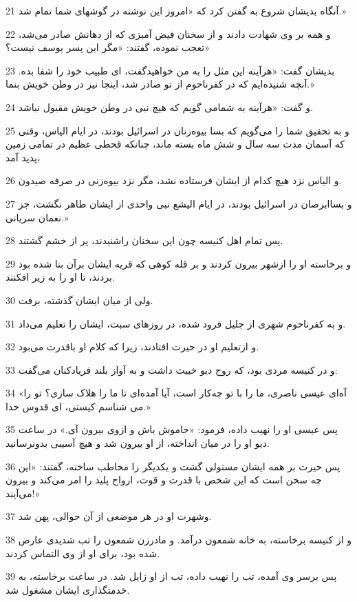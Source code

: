 \par 21 آنگاه بدیشان شروع به گفتن کرد که «امروز این نوشته در گوشهای شما تمام شد.»
\par 22 و همه بر وی شهادت دادند و از سخنان فیض آمیزی که از دهانش صادر می‌شد، تعجب نموده، گفتند: «مگر این پسر یوسف نیست؟»
\par 23 بدیشان گفت: «هرآینه این مثل را به من خواهیدگفت، ای طبیب خود را شفا بده. آنچه شنیده‌ایم که در کفرناحوم از تو صادر شد، اینجا نیز در وطن خویش بنما.»
\par 24 و گفت: «هرآینه به شمامی گویم که هیچ نبی در وطن خویش مقبول نباشد.
\par 25 و به تحقیق شما را می‌گویم که بسا بیوه‌زنان در اسرائیل بودند، در ایام الیاس، وقتی که آسمان مدت سه سال و شش ماه بسته ماند، چنانکه قحطی عظیم در تمامی زمین پدید آمد،
\par 26 و الیاس نزد هیچ کدام از ایشان فرستاده نشد، مگر نزد بیوه‌زنی در صرفه صیدون.
\par 27 و بساابرصان در اسرائیل بودند، در ایام الیشع نبی واحدی از ایشان طاهر نگشت، جز نعمان سریانی.»
\par 28 پس تمام اهل کنیسه چون این سخنان راشنیدند، پر از خشم گشتند.
\par 29 و برخاسته او را ازشهر بیرون کردند و بر قله کوهی که قریه ایشان برآن بنا شده بود بردند، تا او را به زیر افکنند.
\par 30 ولی از میان ایشان گذشته، برفت.
\par 31 و به کفرناحوم شهری از جلیل فرود شده، در روزهای سبت، ایشان را تعلیم می‌داد.
\par 32 و ازتعلیم او در حیرت افتادند، زیرا که کلام او باقدرت می‌بود.
\par 33 و در کنیسه مردی بود، که روح دیو خبیث داشت و به آواز بلند فریادکنان می‌گفت:
\par 34 «آه‌ای عیسی ناصری، ما را با تو چه‌کار است، آیا آمده‌ای تا ما را هلاک سازی؟ تو را می شناسم کیستی، ای قدوس خدا.»
\par 35 پس عیسی او را نهیب داده، فرمود: «خاموش باش و ازوی بیرون آی.» در ساعت دیو او را در میان انداخته، از او بیرون شد و هیچ آسیبی بدونرسانید.
\par 36 پس حیرت بر همه ایشان مستولی گشت و یکدیگر را مخاطب ساخته، گفتند: «این چه سخن است که این شخص با قدرت و قوت، ارواح پلید را امر می‌کند و بیرون می‌آیند!»
\par 37 وشهرت او در هر موضعی از آن حوالی، پهن شد.
\par 38 و از کنیسه برخاسته، به خانه شمعون درآمد. و مادر‌زن شمعون را تب شدیدی عارض شده بود، برای او از وی التماس کردند.
\par 39 پس برسر وی آمده، تب را نهیب داده، تب از او زایل شد. در ساعت برخاسته، به خدمتگذاری ایشان مشغول شد.
